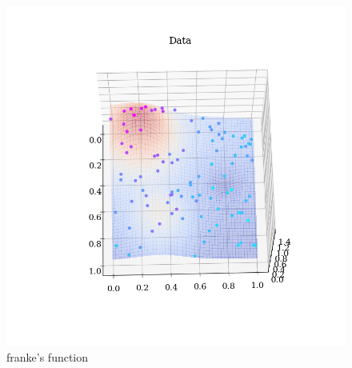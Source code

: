 \documentclass[twoside,11pt]{report}
\begin{document}
\begin{figure}
    \caption{\small franke's function}
    \begin{center}
    \begin{adjustbox}{clip,trim=4cm 3.4cm 3cm 4.8cm, max width=0.3\textwidth}
        \includegraphics{../runsAndAdditions/synthDataTop.png}
    \end{adjustbox}
    \end{center}
\end{figure}
\end{document}
